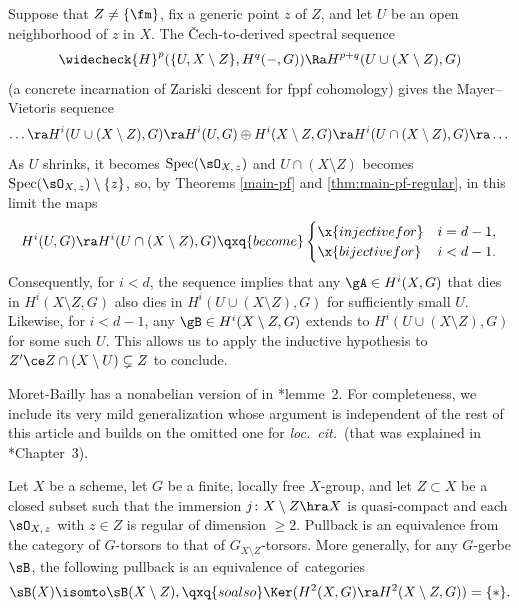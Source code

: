 Suppose that $Z \neq \{\fm\}$, fix a generic point $z$ of $Z$, and let $U$ be an open neighborhood of $z$ in $X$. The \v{C}ech-to-derived spectral sequence  %
\[
\widecheck{H}^p(\{U, X \setminus Z\}, H^q(-, G)) \Ra H^{p+q}(U \cup (X \setminus Z), G)
\]
(a concrete incarnation of Zariski descent for fppf cohomology) gives the Mayer--Vietoris sequence
\[
\dotsc \ra H^i(U \cup (X \setminus Z), G) \ra H^i(U, G) \oplus H^i(X \setminus Z, G) \ra H^i(U \cap (X \setminus Z), G) \ra \dotsc
\]
As $U$ shrinks, it becomes $\Spec(\sO_{X,\, z})$ and $U \cap (X \setminus Z)$ becomes $\Spec(\sO_{X,\, z}) \setminus \{ z\}$, so, by Theorems \ref{main-pf} and \ref{thm:main-pf-regular}, in this limit the maps
\[
H^i(U, G) \ra H^i(U \cap (X \setminus Z), G) \qxq{become} \begin{cases} \x{injective for}  &i = d - 1, \\ \x{bijective for} & i < d - 1.
\end{cases}
\]
Consequently, for $i < d$, the sequence implies that any $\gA \in H^i(X, G)$  that dies in $H^i(X \setminus Z, G)$ also dies in $H^i(U \cup (X \setminus Z), G)$ for sufficiently small $U$. Likewise, for $i < d - 1$, any $\gB \in H^i(X \setminus Z, G)$ extends to $H^i(U \cup (X \setminus Z), G)$ for some such $U$. This allows us to apply the inductive hypothesis to $Z' \ce Z \cap (X \setminus U) \subsetneq Z$ to conclude.
\epf





Moret-Bailly has a nonabelian version of  in \cite{MB85b}*{lemme~2}. For completeness, we include its very mild generalization whose argument is independent of the rest of this article and builds on the omitted one for \emph{loc.~cit.}~(that was explained in \cite{Mar16}*{Chapter~3}). %

\bthm\label{MB-lem}
Let $X$ be a scheme, let $G$ be a finite, locally free $X$-group, and let $Z \subset X$ be a closed subset such that the immersion $j \colon X \setminus Z \hra X$ is quasi-compact and each $\sO_{X,\, z}$ with $z \in Z$ is regular of dimension $\ge 2$. Pullback is an equivalence from the category of $G$-torsors to that of $G_{X\setminus Z}$-torsors. More generally, for any $G$-gerbe $\sB$, the following pullback is an equivalence of~categories\ucolon
\[
\sB(X) \isomto \sB(X\setminus Z), \qxq{so also} \Ker(H^2(X, G) \ra H^2(X\setminus Z, G)) = \{ *\}.
\]
\ethm

